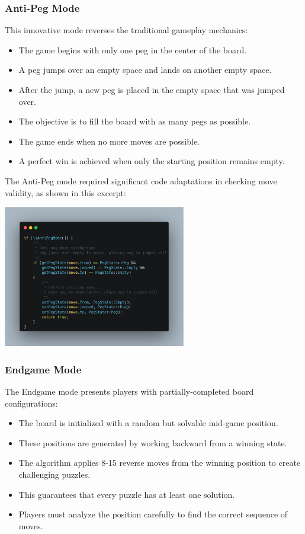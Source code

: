 \subsubsection{Anti-Peg Mode}
This innovative mode reverses the traditional gameplay mechanics:
\begin{itemize}
    \item The game begins with only one peg in the center of the board.
    \item A peg jumps over an empty space and lands on another empty space.
    \item After the jump, a new peg is placed in the empty space that was jumped over.
    \item The objective is to fill the board with as many pegs as possible.
    \item The game ends when no more moves are possible.
    \item A perfect win is achieved when only the starting position remains empty.
\end{itemize}

The Anti-Peg mode required significant code adaptations in checking move validity, as shown in this excerpt:

\begin{center}
\includegraphics[width=0.6\textwidth]{resource/code-examples/AntiPeg.png}
\end{center}

\subsubsection{Endgame Mode}
The Endgame mode presents players with partially-completed board configurations:
\begin{itemize}
    \item The board is initialized with a random but solvable mid-game position.
    \item These positions are generated by working backward from a winning state.
    \item The algorithm applies 8-15 reverse moves from the winning position to create challenging puzzles.
    \item This guarantees that every puzzle has at least one solution.
    \item Players must analyze the position carefully to find the correct sequence of moves.
\end{itemize}

